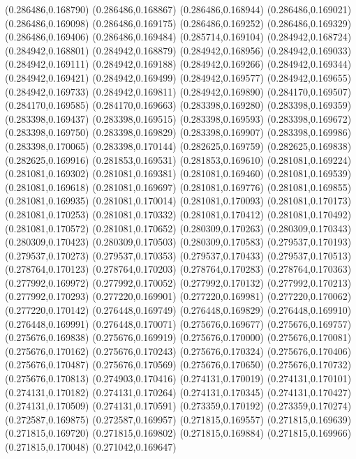 (0.286486,0.168790)
(0.286486,0.168867)
(0.286486,0.168944)
(0.286486,0.169021)
(0.286486,0.169098)
(0.286486,0.169175)
(0.286486,0.169252)
(0.286486,0.169329)
(0.286486,0.169406)
(0.286486,0.169484)
(0.285714,0.169104)
(0.284942,0.168724)
(0.284942,0.168801)
(0.284942,0.168879)
(0.284942,0.168956)
(0.284942,0.169033)
(0.284942,0.169111)
(0.284942,0.169188)
(0.284942,0.169266)
(0.284942,0.169344)
(0.284942,0.169421)
(0.284942,0.169499)
(0.284942,0.169577)
(0.284942,0.169655)
(0.284942,0.169733)
(0.284942,0.169811)
(0.284942,0.169890)
(0.284170,0.169507)
(0.284170,0.169585)
(0.284170,0.169663)
(0.283398,0.169280)
(0.283398,0.169359)
(0.283398,0.169437)
(0.283398,0.169515)
(0.283398,0.169593)
(0.283398,0.169672)
(0.283398,0.169750)
(0.283398,0.169829)
(0.283398,0.169907)
(0.283398,0.169986)
(0.283398,0.170065)
(0.283398,0.170144)
(0.282625,0.169759)
(0.282625,0.169838)
(0.282625,0.169916)
(0.281853,0.169531)
(0.281853,0.169610)
(0.281081,0.169224)
(0.281081,0.169302)
(0.281081,0.169381)
(0.281081,0.169460)
(0.281081,0.169539)
(0.281081,0.169618)
(0.281081,0.169697)
(0.281081,0.169776)
(0.281081,0.169855)
(0.281081,0.169935)
(0.281081,0.170014)
(0.281081,0.170093)
(0.281081,0.170173)
(0.281081,0.170253)
(0.281081,0.170332)
(0.281081,0.170412)
(0.281081,0.170492)
(0.281081,0.170572)
(0.281081,0.170652)
(0.280309,0.170263)
(0.280309,0.170343)
(0.280309,0.170423)
(0.280309,0.170503)
(0.280309,0.170583)
(0.279537,0.170193)
(0.279537,0.170273)
(0.279537,0.170353)
(0.279537,0.170433)
(0.279537,0.170513)
(0.278764,0.170123)
(0.278764,0.170203)
(0.278764,0.170283)
(0.278764,0.170363)
(0.277992,0.169972)
(0.277992,0.170052)
(0.277992,0.170132)
(0.277992,0.170213)
(0.277992,0.170293)
(0.277220,0.169901)
(0.277220,0.169981)
(0.277220,0.170062)
(0.277220,0.170142)
(0.276448,0.169749)
(0.276448,0.169829)
(0.276448,0.169910)
(0.276448,0.169991)
(0.276448,0.170071)
(0.275676,0.169677)
(0.275676,0.169757)
(0.275676,0.169838)
(0.275676,0.169919)
(0.275676,0.170000)
(0.275676,0.170081)
(0.275676,0.170162)
(0.275676,0.170243)
(0.275676,0.170324)
(0.275676,0.170406)
(0.275676,0.170487)
(0.275676,0.170569)
(0.275676,0.170650)
(0.275676,0.170732)
(0.275676,0.170813)
(0.274903,0.170416)
(0.274131,0.170019)
(0.274131,0.170101)
(0.274131,0.170182)
(0.274131,0.170264)
(0.274131,0.170345)
(0.274131,0.170427)
(0.274131,0.170509)
(0.274131,0.170591)
(0.273359,0.170192)
(0.273359,0.170274)
(0.272587,0.169875)
(0.272587,0.169957)
(0.271815,0.169557)
(0.271815,0.169639)
(0.271815,0.169720)
(0.271815,0.169802)
(0.271815,0.169884)
(0.271815,0.169966)
(0.271815,0.170048)
(0.271042,0.169647)
